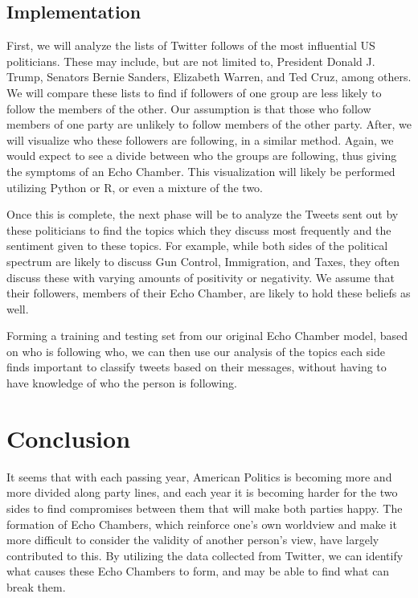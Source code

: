 \documentclass[journal]{IEEEtran}
\begin{document}
	\subsection{Implementation}
	
	First, we will analyze the lists of Twitter follows of the most influential US politicians. These may include, but are not limited to, President Donald J. Trump, Senators Bernie Sanders, Elizabeth Warren, and Ted Cruz, among others. We will compare these lists to find if followers of one group are less likely to follow the members of the other. Our assumption is that those who follow members of one party are unlikely to follow members of the other party. After, we will visualize who these followers are following, in a similar method. Again, we would expect to see a divide between who the groups are following, thus giving the symptoms of an Echo Chamber. This visualization will likely be performed utilizing Python or R, or even a mixture of the two. 
	
	Once this is complete, the next phase will be to analyze the Tweets sent out by these politicians to find the topics which they discuss most frequently and the sentiment given to these topics. For example, while both sides of the political spectrum are likely to discuss Gun Control, Immigration, and Taxes, they often discuss these with varying amounts of positivity or negativity. We assume that their followers, members of their Echo Chamber, are likely to hold these beliefs as well. 
	
	Forming a training and testing set from our original Echo Chamber model, based on who is following who, we can then use our analysis of the topics each side finds important to classify tweets based on their messages, without having to have knowledge of who the person is following. 
	
	
	\section{Conclusion}
	
	It seems that with each passing year, American Politics is becoming more and more divided along party lines, and each year it is becoming harder for the two sides to find compromises between them that will make both parties happy. The formation of Echo Chambers, which reinforce one’s own worldview and make it more difficult to consider the validity of another person’s view, have largely contributed to this. By utilizing the data collected from Twitter, we can identify what causes these Echo Chambers to form, and may be able to find what can break them.
	
	
\end{document}
